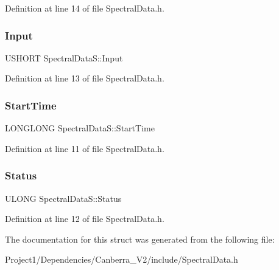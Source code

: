 Definition at line 14 of file Spectral\+Data.\+h.

\mbox{\label{struct_spectral_data_s_a26f617790cc88a0fcb5aa9fe4c8e2c03}} 
\subsubsection{\texorpdfstring{Input}{Input}}
{\footnotesize\ttfamily U\+S\+H\+O\+RT Spectral\+Data\+S\+::\+Input}



Definition at line 13 of file Spectral\+Data.\+h.

\mbox{\label{struct_spectral_data_s_ae0b259b3b13d97e38a5844aed6028a0d}} 
\subsubsection{\texorpdfstring{Start\+Time}{StartTime}}
{\footnotesize\ttfamily L\+O\+N\+G\+L\+O\+NG Spectral\+Data\+S\+::\+Start\+Time}



Definition at line 11 of file Spectral\+Data.\+h.

\mbox{\label{struct_spectral_data_s_acd76ae3549c00e79d15b7dd806a9dcdc}} 
\subsubsection{\texorpdfstring{Status}{Status}}
{\footnotesize\ttfamily U\+L\+O\+NG Spectral\+Data\+S\+::\+Status}



Definition at line 12 of file Spectral\+Data.\+h.



The documentation for this struct was generated from the following file\+:\begin{DoxyCompactItemize}
\item 
Project1/\+Dependencies/\+Canberra\+\_\+\+V2/include/Spectral\+Data.\+h\end{DoxyCompactItemize}

